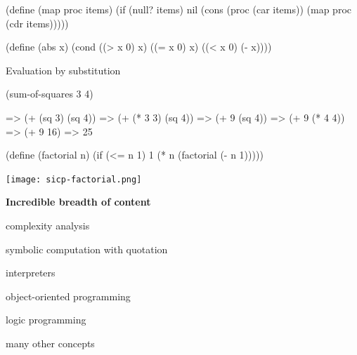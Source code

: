 \documentclass[UKenglish,usenames,dvipsnames,svgnames,table,aspectratio=169,mathserif]{beamer}
\newcommand{\nl}{\vspace{\baselineskip}}
\begin{document}
\begin{frame}[fragile]
\begin{schemecode}
(define (map proc items)
  (if (null? items)
      nil
      (cons (proc (car items))
            (map proc (cdr items)))))
\end{schemecode}
\end{frame}


\begin{frame}[fragile]
\begin{schemecode}
(define (abs x)
  (cond ((> x 0) x)
        ((= x 0) x)
        ((< x 0) (- x))))
\end{schemecode}
\end{frame}


\begin{frame}[fragile]
Evaluation by substitution

\nl
\begin{schemecode}
     (sum-of-squares 3 4)

=>   (+ (sq 3) (sq 4))
=>   (+ (* 3 3) (sq 4))
=>   (+ 9 (sq 4))
=>   (+ 9 (* 4 4))
=>   (+ 9 16)
=>   25
\end{schemecode}
\end{frame}


\begin{frame}[fragile]
\begin{schemecode}
(define (factorial n)
  (if (<= n 1)
      1
      (* n (factorial (- n 1)))))
\end{schemecode}
\end{frame}


\begin{frame}
\centering
\texttt{[image: sicp-factorial.png]}
\end{frame}


\begin{frame}

\begin{center}
{\bf Incredible breadth of content}
\end{center}
\begin{center} complexity analysis \end{center}
\begin{center} symbolic computation with quotation \end{center}
\begin{center} interpreters \end{center}
\begin{center} object-oriented programming \end{center}
\begin{center} logic programming \end{center}
\begin{center} many other concepts \end{center}
\end{frame}
\end{document}
